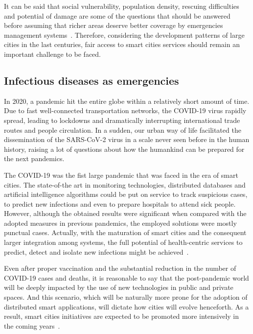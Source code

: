 \begin{refsection}
It can be said that social vulnerability, population density, rescuing difficulties and potential of damage are some of the questions that should be answered before assuming that richer areas deserve better coverage by emergencies management systems~\cite{emergenciesmetric1}. Therefore, considering the development patterns of large cities in the last centuries, fair access to smart cities services should remain an important challenge to be faced. 

\subsection{Infectious diseases as emergencies}

In 2020, a pandemic hit the entire globe within a relatively short amount of time. Due to fast well-connected transportation networks, the COVID-19 virus rapidly spread, leading to lockdowns and dramatically interrupting international trade routes and people circulation. In a sudden, our urban way of life facilitated the dissemination of the SARS-CoV-2 virus in a scale never seen before in the human history, raising a lot of questions about how the humankind can be prepared for the next pandemics.

The COVID-19 was the fist large pandemic that was faced in the era of smart cities. The state-of-the art in monitoring technologies, distributed databases and artificial intelligence algorithms could be put on service to track suspicious cases, to predict new infections and even to prepare hospitals to attend sick people. However, although the obtained results were significant when compared with the adopted measures in previous pandemics, the employed solutions were mostly punctual cases. Actually, with the maturation of smart cities and the consequent larger integration among systems, the full potential of health-centric services to predict, detect and isolate new infections might be achieved~\cite{covidsmartcities2}.

Even after proper vaccination and the substantial reduction in the number of COVID-19 cases and deaths, it is reasonable to say that the post-pandemic world will be deeply impacted by the use of new technologies in public and private spaces. And this scenario, which will be naturally more prone for the adoption of distributed smart applications, will dictate how cities will evolve henceforth. As a result, smart cities initiatives are expected to be promoted more intensively in the coming years~\cite{covidsmartcities6}.


\end{refsection}
